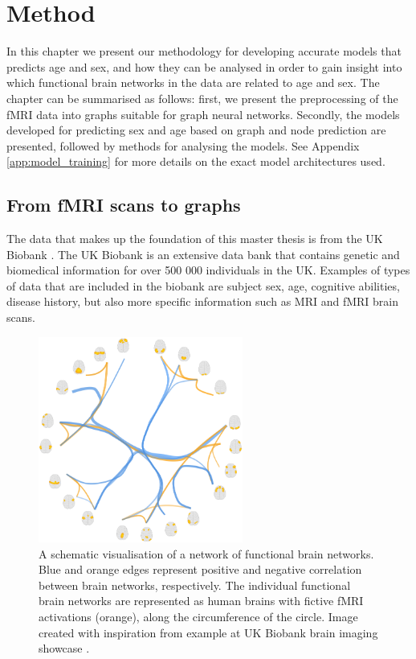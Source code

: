\chapter{Method}
\label{chap:method}

In this chapter we present our methodology for developing accurate models that predicts age and sex, and how they can be analysed in order to gain insight into which functional brain networks in the data are related to age and sex. The chapter can be summarised as follows: first, we present the preprocessing of the fMRI data into graphs suitable for graph neural networks. Secondly, the models developed for predicting sex and age based on graph and node prediction are presented, followed by methods for analysing the models. See Appendix \ref{app:model_training} for more details on the exact model architectures used. 

\section{From fMRI scans to graphs}\label{sec:fmri_to_graphs}
The data that makes up the foundation of this master thesis is from the UK Biobank \cite{ukbiobank}. The UK Biobank is an extensive data bank that contains genetic and biomedical information for over 500 000 individuals in the UK. Examples of types of data that are included in the biobank are subject sex, age, cognitive abilities, disease history, but also more specific information such as MRI and fMRI brain scans.

\begin{figure}[H]
    \centering
    \includegraphics[width=0.6\textwidth]{chapters/images_methods/fmri_network_redone.png}
    \caption{A schematic visualisation of a network of functional brain networks. Blue and orange edges represent positive and negative correlation between brain networks, respectively.  The individual functional brain networks are represented as human brains with fictive fMRI activations (orange), along the circumference of the circle. Image created with inspiration from example at UK Biobank brain imaging showcase \cite{ukbiobank_brain_imaging}.}
    \label{fig:fmri_network}
\end{figure}

